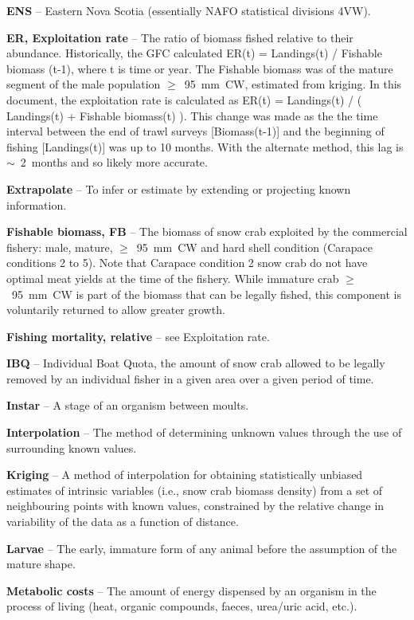 \documentclass[11pt]{article}
\begin{document}
\textbf{ENS} -- Eastern Nova Scotia (essentially NAFO statistical divisions 4VW). 

\textbf{ER, Exploitation rate} -- The ratio of biomass fished relative to their abundance. Historically, the GFC calculated ER(t) = Landings(t) / Fishable biomass (t-1), where t is time or year. The Fishable biomass was of the mature segment of the male population $\geq$~95~mm~CW, estimated from kriging. In this document, the exploitation rate is calculated as ER(t) = Landings(t) / ( Landings(t) + Fishable biomass(t) ). This change was made as the the time interval between the end of trawl surveys [Biomass(t-1)] and the beginning of fishing [Landings(t)] was up to 10 months. With the alternate method, this lag is $\sim$~2~months and so likely more accurate. 

\textbf{Extrapolate} -- To infer or estimate by extending or projecting known information.

\textbf{Fishable biomass, FB} -- The biomass of snow crab exploited by the commercial fishery: male, mature, $\geq$~95~mm~CW and hard shell condition (Carapace conditions 2 to 5). Note that Carapace condition 2 snow crab do not have optimal meat yields at the time of the fishery. While immature crab $\geq$~95~mm~CW is part of the biomass that can be legally fished, this component is voluntarily returned to allow greater growth.

\textbf{Fishing mortality, relative} -- see Exploitation rate.

\textbf{IBQ} -- Individual Boat Quota, the amount of snow crab allowed to be legally removed by an individual fisher in a given area over a given period of time.

\textbf{Instar} -- A stage of an organism between moults.

\textbf{Interpolation} -- The method of determining unknown values through the use of surrounding known values.

\textbf{Kriging} -- A method of interpolation for obtaining statistically unbiased estimates of intrinsic variables (i.e., snow crab biomass density) from a set of neighbouring points with known values, constrained by the relative change in variability of the data as a function of distance.

\textbf{Larvae} -- The early, immature form of any animal before the assumption of the mature shape.

\textbf{Metabolic costs} -- The amount of energy dispensed by an organism in the process of living (heat, organic compounds, faeces, urea/uric acid, etc.).
\end{document}
